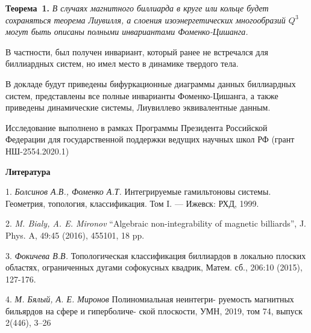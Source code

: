 	\textbf{Теорема~1.} {\it В случаях магнитного биллиарда в круге или кольце будет сохраняться теорема Лиувилля, а слоения изоэнергетических многообразий $Q^3$ могут быть описаны полными инвариантами Фоменко-Цишанга.}
	
	В частности, был получен инвариант, который ранее не встречался для биллиардных систем, но имел место в динамике твердого тела. 
	
	В докладе будут приведены бифуркационные диаграммы данных биллиардных систем, представлены все полные инварианты Фоменко-Цишанга, а также приведены динамические системы, Лиувиллево эквивалентные данным.
	
	Исследование выполнено в рамках Программы Президента Российской Федерации для государственной поддержки ведущих научных школ РФ (грант НШ-2554.2020.1)
	
	\smallskip \centerline {\bf Литература} \nopagebreak
	
	1. {\it Болсинов А.В., Фоменко А.Т.} Интегрируемые гамильтоновы системы. Геометрия, топология, классификация. Том I.
	--- Ижевск: РХД, 1999.
	
	2. {\it M. Bialy, A. E. Mironov} “Algebraic non-integrability of magnetic billiards”,
	J. Phys. A, 49:45 (2016), 455101, 18 pp.
	
	3. {\it Фокичева В.В.} Топологическая классификация биллиардов в локально плоских областях, ограниченных дугами софокусных квадрик, Матем. сб., 206:10 (2015), 127-176.
	
	4. {\it М. Бялый, А. Е. Миронов} Полиномиальная неинтегри-
	руемость магнитных бильярдов на сфере и гиперболиче-
	ской плоскости, УМН, 2019, том 74, выпуск 2(446), 3–26
